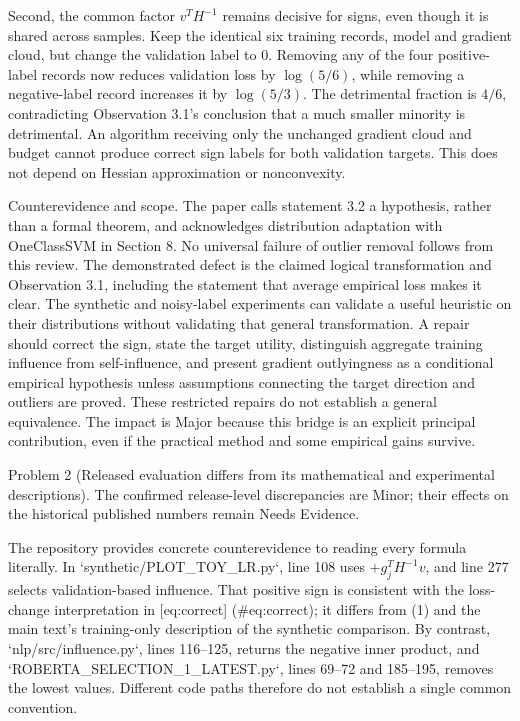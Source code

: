 \documentclass[10pt]{article}
\begin{document}
Second, the common factor \(v^TH^{-1}\) remains decisive for signs, even though it is shared across samples. Keep the identical six training records, model and gradient cloud, but change the validation label to \(0\). Removing any of the four positive-label records now reduces validation loss by \(\log(5/6)\), while removing a negative-label record increases it by \(\log(5/3)\). The detrimental fraction is \(4/6\), contradicting Observation 3.1’s conclusion that a much smaller minority is detrimental. An algorithm receiving only the unchanged gradient cloud and budget cannot produce correct sign labels for both validation targets. This does not depend on Hessian approximation or nonconvexity.\par
Counterevidence and scope. The paper calls statement 3.2 a hypothesis, rather than a formal theorem, and acknowledges distribution adaptation with OneClassSVM in Section 8. No universal failure of outlier removal follows from this review. The demonstrated defect is the claimed logical transformation and Observation 3.1, including the statement that average empirical loss makes it clear. The synthetic and noisy-label experiments can validate a useful heuristic on their distributions without validating that general transformation. A repair should correct the sign, state the target utility, distinguish aggregate training influence from self-influence, and present gradient outlyingness as a conditional empirical hypothesis unless assumptions connecting the target direction and outliers are proved. These restricted repairs do not establish a general equivalence. The impact is Major because this bridge is an explicit principal contribution, even if the practical method and some empirical gains survive.\par
Problem 2 (Released evaluation differs from its mathematical and experimental descriptions).  The confirmed release-level discrepancies are Minor; their effects on the historical published numbers remain Needs Evidence.\par
The repository provides concrete counterevidence to reading every formula literally. In `synthetic/PLOT\_TOY\_LR.py`, line 108 uses \(+g_j^TH^{-1}v\), and line 277 selects validation-based influence. That positive sign is consistent with the loss-change interpretation in [eq:correct] (\#eq:correct); it differs from (1) and the main text’s training-only description of the synthetic comparison. By contrast, `nlp/src/influence.py`, lines 116–125, returns the negative inner product, and `ROBERTA\_SELECTION\_1\_LATEST.py`, lines 69–72 and 185–195, removes the lowest values. Different code paths therefore do not establish a single common convention.\par
\end{document}
